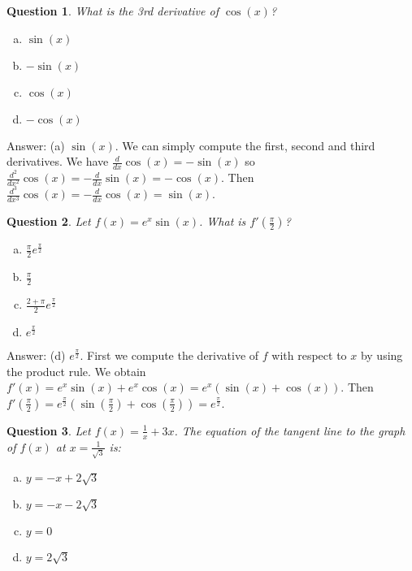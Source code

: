 \documentclass[10pt]{article}
\newtheorem{quiz}{Question}
\begin{document}
 \begin{multicols}{2}

\begin{quiz} What is the 3rd derivative of $\cos(x)$?
\end{quiz}
\begin {enumerate}[(a)]
\item $\sin(x)$
\item $-\sin(x)$
\item $\cos(x)$
\item $-\cos(x)$
\end{enumerate}
\vspace{0.5 cm}

Answer: (a) $\sin(x)$. We can simply compute the first, second and third derivatives. We have $\frac{d}{dx}\cos(x) = -\sin(x)$ so $\frac{d^2}{dx^2}\cos(x) = -\frac{d}{dx}\sin(x) = -\cos(x)$. Then $\frac{d^3}{dx^3}\cos(x) = -\frac{d}{dx}\cos(x) = \sin(x)$. 

\vspace{5mm}

\begin{quiz} Let $f(x) = e^x \sin(x)$. What is $f'(\frac{ \pi}{2})$?
\end{quiz}
\begin {enumerate}[(a)]
\item $\frac{ \pi}{2} e^{\frac{ \pi}{2}}$
\item $\frac{ \pi}{2}$
\item $\frac{2+ \pi}{2} e^\frac{ \pi}{2}$
\item $e^\frac{ \pi}{2}$
\end{enumerate}
\vspace{0.5 cm}

Answer: (d) $e^{\frac{\pi}{2}}$. First we compute the derivative of $f$ with respect to $x$ by using the product rule. We obtain $f'(x) = e^{x}\sin(x) + e^{x}\cos(x) = e^{x}(\sin(x) + \cos(x))$. Then $f'(\frac{\pi}{2}) = e^{\frac{\pi}{2}}(\sin(\frac{\pi}{2}) + \cos(\frac{\pi}{2})) = e^{\frac{\pi}{2}}$.

\vfill
\columnbreak

\begin{quiz}Let $f(x) = \frac{1}{x} + 3 x$. The equation of the tangent line to the graph of $f(x)$ at $x = \frac{1}{\sqrt{3}}$ is:
\end{quiz}
\begin {enumerate}[(a)]
\item $y= -x + 2\sqrt{3}$
\item $y = -x - 2\sqrt{3}$
\item $y = 0$
\item $y = 2\sqrt{3}$
\end{enumerate}


\end{multicols}
\end{document}
